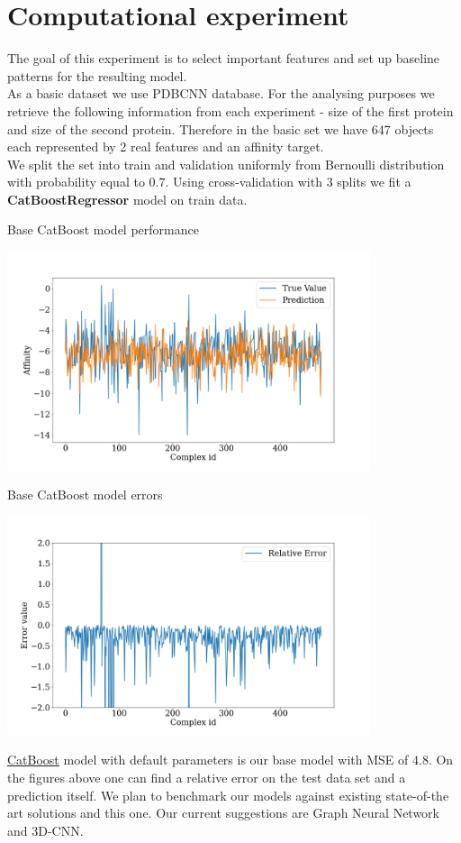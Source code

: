 \section{Computational experiment}
The goal of this experiment is to select important features and set up baseline patterns for the resulting model. \\
As a basic dataset we use PDBCNN database\cite{database}. For the analysing purposes we retrieve the following information from each experiment - size of the first protein and size of the second protein. Therefore in the basic set we have 647 objects each represented by 2 real features and an affinity target. \\
We split the set into train and validation uniformly from Bernoulli distribution with probability equal to $0.7$. 
Using cross-validation with 3 splits we fit a \textbf{CatBoostRegressor} model on train data.

\begin{center}
\caption{Base CatBoost model performance}
\includegraphics[width=0.8\textwidth]{contents/pred.png}
\end{center}

\begin{center}
\caption{Base CatBoost model errors}
\includegraphics[width=0.8\textwidth]{contents/error.png}
\end{center}

\href{https://catboost.ai/docs/concepts/python-quickstart}{CatBoost} model with default parameters is our base model with MSE of $4.8$. On the figures above one can find a relative error on the test data set and a prediction itself. 
We plan to benchmark our models against existing state-of-the art solutions and this one. Our current suggestions are Graph Neural Network and 3D-CNN.